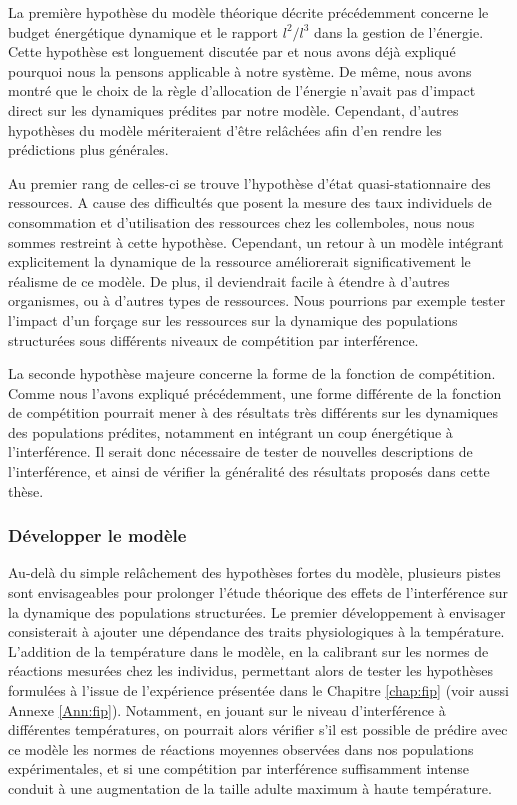 La première hypothèse du modèle théorique décrite précédemment concerne le
budget énergétique dynamique et le rapport $l^2 / l^3$ dans la gestion de
l'énergie. Cette hypothèse est longuement discutée par \textcites{kooijman2000a}
et nous avons déjà expliqué pourquoi nous la pensons applicable à notre système.
De même, nous avons montré que le choix de la règle d'allocation de l'énergie
n'avait pas d'impact direct sur les dynamiques prédites par notre modèle.
Cependant, d'autres hypothèses du modèle mériteraient d'être relâchées afin d'en
rendre les prédictions plus générales.

Au premier rang de celles-ci se trouve l'hypothèse d'état quasi-stationnaire des
ressources. A cause des difficultés que posent la mesure des taux individuels de
consommation et d'utilisation des ressources chez les collemboles, nous nous
sommes restreint à cette hypothèse. Cependant, un retour à un modèle intégrant
explicitement la dynamique de la ressource améliorerait significativement le
réalisme de ce modèle. De plus, il deviendrait facile à
étendre à d'autres organismes, ou à d'autres types de ressources. Nous pourrions
par exemple tester l'impact d'un forçage sur les ressources sur la dynamique des
populations structurées sous différents niveaux de compétition par interférence.

La seconde hypothèse majeure concerne la forme de la fonction de compétition.
Comme nous l'avons expliqué précédemment, une forme différente de la fonction de
compétition pourrait mener à des résultats très différents sur les dynamiques
des populations prédites, notamment en intégrant un coup énergétique à
l'interférence. Il serait donc nécessaire de tester de nouvelles descriptions
de l'interférence, et ainsi de vérifier la généralité des résultats proposés
dans cette thèse.

\subsubsection{Développer le modèle}

Au-delà du simple relâchement des hypothèses fortes du modèle, plusieurs pistes
sont envisageables pour prolonger l'étude théorique des effets de l'interférence
sur la dynamique des populations structurées. Le premier développement à
envisager consisterait à ajouter une dépendance des traits physiologiques à la
température. L'addition de la température dans le modèle, en la calibrant sur
les normes de réactions mesurées chez les individus, permettant alors de tester
les hypothèses formulées à l'issue de l'expérience présentée dans le Chapitre
\ref{chap:fip} (voir aussi Annexe \ref{Ann:fip}). Notamment, en jouant sur le
niveau d'interférence à différentes températures, on pourrait alors vérifier
s'il est possible de prédire avec ce modèle les normes de réactions moyennes
observées dans nos populations expérimentales, et si une compétition
par interférence suffisamment intense conduit à une augmentation de la taille
adulte maximum à haute température.

